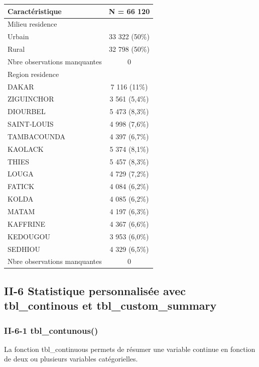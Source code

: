 \documentclass[
]{article}
\begin{document}
\begin{longtable}[]{@{}lc@{}}
\toprule\noalign{}
\textbf{Caractéristique} & \textbf{N = 66 120} \\
\midrule\noalign{}
\endhead
\bottomrule\noalign{}
\endlastfoot
Milieu residence & \\
Urbain & 33 322 (50\%) \\
Rural & 32 798 (50\%) \\
Nbre observations manquantes & 0 \\
Region residence & \\
DAKAR & 7 116 (11\%) \\
ZIGUINCHOR & 3 561 (5,4\%) \\
DIOURBEL & 5 473 (8,3\%) \\
SAINT-LOUIS & 4 998 (7,6\%) \\
TAMBACOUNDA & 4 397 (6,7\%) \\
KAOLACK & 5 374 (8,1\%) \\
THIES & 5 457 (8,3\%) \\
LOUGA & 4 729 (7,2\%) \\
FATICK & 4 084 (6,2\%) \\
KOLDA & 4 085 (6,2\%) \\
MATAM & 4 197 (6,3\%) \\
KAFFRINE & 4 367 (6,6\%) \\
KEDOUGOU & 3 953 (6,0\%) \\
SEDHIOU & 4 329 (6,5\%) \\
Nbre observations manquantes & 0 \\
\end{longtable}

\hypertarget{ii-6-statistique-personnalisuxe9e-avec-tbl_continous-et-tbl_custom_summary}{%
\subsection{II-6 Statistique personnalisée avec tbl\_continous et
tbl\_custom\_summary}\label{ii-6-statistique-personnalisuxe9e-avec-tbl_continous-et-tbl_custom_summary}}

\hypertarget{ii-6-1-tbl_contunous}{%
\subsubsection{II-6-1 tbl\_contunous()}\label{ii-6-1-tbl_contunous}}

La fonction tbl\_continuous permets de résumer une variable continue en
fonction de deux ou plusieurs variables catégorielles.
\end{document}
